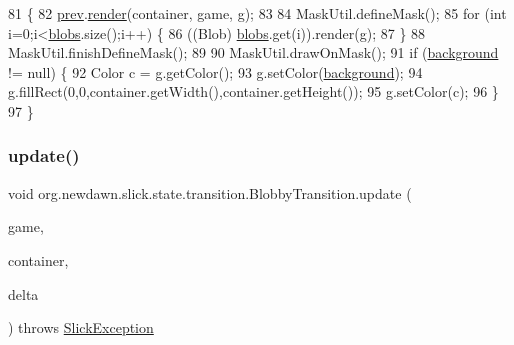 \begin{DoxyCode}
81                                               \{
82         \mbox{\hyperlink{classorg_1_1newdawn_1_1slick_1_1state_1_1transition_1_1_blobby_transition_a3bb220b6374d73d624f348b722941410}{prev}}.\mbox{\hyperlink{interfaceorg_1_1newdawn_1_1slick_1_1state_1_1_game_state_a065352d2725274c5244cd022f226eb17}{render}}(container, game, g);
83         
84         MaskUtil.defineMask();
85         \textcolor{keywordflow}{for} (\textcolor{keywordtype}{int} i=0;i<\mbox{\hyperlink{classorg_1_1newdawn_1_1slick_1_1state_1_1transition_1_1_blobby_transition_a24d7e69f14903f10e5849398b9df536a}{blobs}}.size();i++) \{
86             ((Blob) \mbox{\hyperlink{classorg_1_1newdawn_1_1slick_1_1state_1_1transition_1_1_blobby_transition_a24d7e69f14903f10e5849398b9df536a}{blobs}}.get(i)).render(g);
87         \}
88         MaskUtil.finishDefineMask();
89 
90         MaskUtil.drawOnMask();
91         \textcolor{keywordflow}{if} (\mbox{\hyperlink{classorg_1_1newdawn_1_1slick_1_1state_1_1transition_1_1_blobby_transition_a53b1caa1a2eccd2cbb1a5d46b3f2c95b}{background}} != null) \{
92             Color c = g.getColor();
93             g.setColor(\mbox{\hyperlink{classorg_1_1newdawn_1_1slick_1_1state_1_1transition_1_1_blobby_transition_a53b1caa1a2eccd2cbb1a5d46b3f2c95b}{background}});
94             g.fillRect(0,0,container.getWidth(),container.getHeight());
95             g.setColor(c);
96         \}
97     \}
\end{DoxyCode}
\mbox{\label{classorg_1_1newdawn_1_1slick_1_1state_1_1transition_1_1_blobby_transition_aaa0d8b8dcc426ac891d25778066c4fcd}} 
\subsubsection{\texorpdfstring{update()}{update()}}
{\footnotesize\ttfamily void org.\+newdawn.\+slick.\+state.\+transition.\+Blobby\+Transition.\+update (\begin{DoxyParamCaption}\item[{\mbox{\hyperlink{classorg_1_1newdawn_1_1slick_1_1state_1_1_state_based_game}{State\+Based\+Game}}}]{game,  }\item[{\mbox{\hyperlink{classorg_1_1newdawn_1_1slick_1_1_game_container}{Game\+Container}}}]{container,  }\item[{int}]{delta }\end{DoxyParamCaption}) throws \mbox{\hyperlink{classorg_1_1newdawn_1_1slick_1_1_slick_exception}{Slick\+Exception}}\hspace{0.3cm}{\ttfamily [inline]}}

